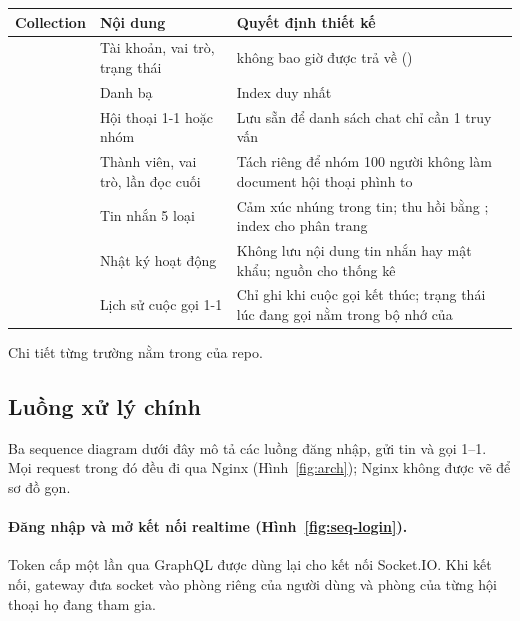 \documentclass[11pt, a4paper]{article}
\begin{document}
\begin{table}[H]
  \centering
  \small
  \begin{tabularx}{\linewidth}{lYY}
    \toprule
    \textbf{Collection} & \textbf{Nội dung} & \textbf{Quyết định thiết kế} \\
    \midrule
     & Tài khoản, vai trò, trạng thái &  không bao giờ được trả về () \\
     & Danh bạ & Index duy nhất  \\
     & Hội thoại 1-1 hoặc nhóm & Lưu sẵn  để danh sách chat chỉ cần 1 truy vấn \\
     & Thành viên, vai trò, lần đọc cuối & Tách riêng để nhóm 100 người không làm document hội thoại phình to \\
     & Tin nhắn 5 loại & Cảm xúc nhúng trong tin; thu hồi bằng ; index  cho phân trang \\
     & Nhật ký hoạt động & Không lưu nội dung tin nhắn hay mật khẩu; nguồn cho thống kê \\
     & Lịch sử cuộc gọi 1-1 & Chỉ ghi khi cuộc gọi kết thúc; trạng thái lúc đang gọi nằm trong bộ nhớ của  \\
    \bottomrule
  \end{tabularx}
\end{table}

Chi tiết từng trường nằm trong  của repo.

\subsection{Luồng xử lý chính}
\label{sec:flows}

Ba sequence diagram dưới đây mô tả các luồng đăng nhập, gửi tin và gọi 1--1. Mọi request trong đó đều đi qua Nginx (Hình~\ref{fig:arch}); Nginx không được vẽ để sơ đồ gọn.

\paragraph{Đăng nhập và mở kết nối realtime (Hình~\ref{fig:seq-login}).} Token cấp một lần qua GraphQL được dùng lại cho kết nối Socket.IO. Khi kết nối, gateway đưa socket vào phòng riêng của người dùng và phòng của từng hội thoại họ đang tham gia.
\end{document}
